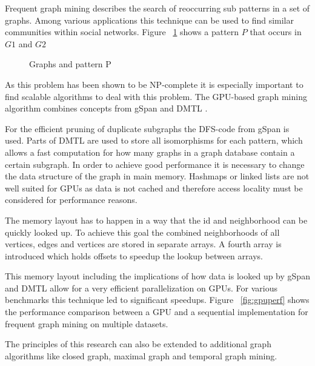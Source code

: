 \documentclass{sig-alternate}
\begin{document}
Frequent graph mining describes the search of reoccurring sub patterns 
in a set of graphs. Among various applications this technique can be used to
find similar communities within social networks.
Figure ~\ref{fig:subgraphs} shows a pattern $P$ that occurs in $G1$ and $G2$

\begin{figure}[H]
\centering
{}
\caption{Graphs and pattern P \cite{kessl2014parallel}}
\label{fig:subgraphs}
\end{figure}

As this problem has been shown to be NP-complete \cite{ullmann1976algorithm} it is especially important to
find scalable algorithms to deal with this problem.
The GPU-based graph mining algorithm combines concepts from gSpan \cite{yan2002gspan}
and DMTL \cite{chaoji2008integrated}.

For the efficient pruning of duplicate subgraphs the DFS-code from gSpan is used.
Parts of DMTL are used to store all isomorphisms for each pattern, which allows 
a fast computation for how many graphs in a graph database contain a certain subgraph.
In order to achieve good performance it is necessary 
to change the data structure of the graph in main memory. Hashmaps or linked lists
are not well suited for GPUs as data is not cached and therefore access locality 
must be considered for performance reasons. 

The memory layout has to happen in a way that the id and neighborhood can be quickly looked up.
To achieve this goal the combined neighborhoods of all vertices, edges and vertices are stored 
in separate arrays. A fourth array is introduced which holds offsets to speedup the lookup between arrays.

This memory layout including the implications of how data is looked up by gSpan and DMTL allow
for a very efficient parallelization on GPUs.
For various benchmarks this technique led to significant speedups. Figure ~\ref{fig:gpuperf}
shows the performance comparison between a GPU and a sequential implementation 
for frequent graph mining on multiple datasets.

The principles of this research can also be extended to additional graph algorithms like closed graph,
maximal graph and temporal graph mining.

\begin{figure*}
\centering
{}
\caption{GPU Benchmarks \cite{kessl2014parallel}}
\label{fig:gpuperf}
\end{figure*}
\end{document}
